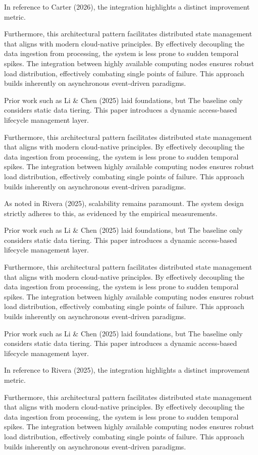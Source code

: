 In reference to Carter (2026), the integration highlights a distinct improvement metric.


Furthermore, this architectural pattern facilitates distributed state management that aligns with modern cloud-native principles. 
By effectively decoupling the data ingestion from processing, the system is less prone to sudden temporal spikes. 
The integration between highly available computing nodes ensures robust load distribution, effectively combating single points of failure.
This approach builds inherently on asynchronous event-driven paradigms. 


Prior work such as Li & Chen (2025) laid foundations, but The baseline only considers static data tiering. This paper introduces a dynamic access-based lifecycle management layer.


Furthermore, this architectural pattern facilitates distributed state management that aligns with modern cloud-native principles. 
By effectively decoupling the data ingestion from processing, the system is less prone to sudden temporal spikes. 
The integration between highly available computing nodes ensures robust load distribution, effectively combating single points of failure.
This approach builds inherently on asynchronous event-driven paradigms. 


As noted in Rivera (2025), scalability remains paramount. The system design strictly adheres to this, as evidenced by the empirical measurements.

Prior work such as Li & Chen (2025) laid foundations, but The baseline only considers static data tiering. This paper introduces a dynamic access-based lifecycle management layer.


Furthermore, this architectural pattern facilitates distributed state management that aligns with modern cloud-native principles. 
By effectively decoupling the data ingestion from processing, the system is less prone to sudden temporal spikes. 
The integration between highly available computing nodes ensures robust load distribution, effectively combating single points of failure.
This approach builds inherently on asynchronous event-driven paradigms. 


Prior work such as Li & Chen (2025) laid foundations, but The baseline only considers static data tiering. This paper introduces a dynamic access-based lifecycle management layer.

In reference to Rivera (2025), the integration highlights a distinct improvement metric.


Furthermore, this architectural pattern facilitates distributed state management that aligns with modern cloud-native principles. 
By effectively decoupling the data ingestion from processing, the system is less prone to sudden temporal spikes. 
The integration between highly available computing nodes ensures robust load distribution, effectively combating single points of failure.
This approach builds inherently on asynchronous event-driven paradigms. 
